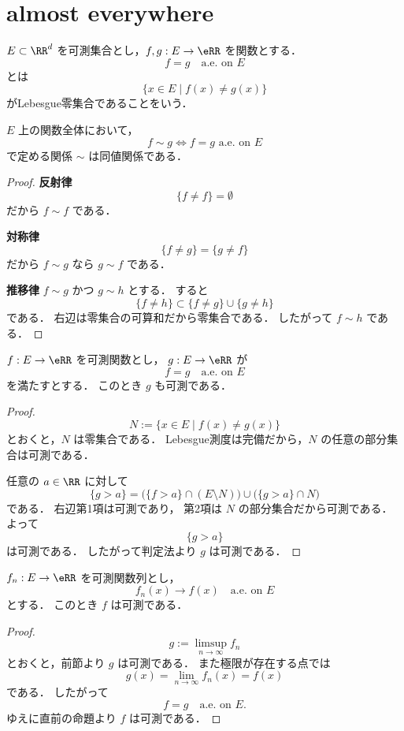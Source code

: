 \section{almost everywhere}

\begin{definition}
$E \subset \RR^d$ を可測集合とし，$f,g:E\to\eRR$ を関数とする．
\[
f=g \quad \text{a.e.\ on } E
\]
とは
\[
\{x\in E\mid f(x)\ne g(x)\}
\]
がLebesgue零集合であることをいう．
\end{definition}

\begin{proposition}
$E$ 上の関数全体において，
\[
f\sim g \iff f=g \text{ a.e.\ on } E
\]
で定める関係 $\sim$ は同値関係である．
\end{proposition}
\begin{proof}
\textbf{反射律}\quad
\[
\{f\ne f\}=\emptyset
\]
だから $f\sim f$ である．

\textbf{対称律}\quad
\[
\{f\ne g\}=\{g\ne f\}
\]
だから $f\sim g$ なら $g\sim f$ である．

\textbf{推移律}\quad
$f\sim g$ かつ $g\sim h$ とする．
すると
\[
\{f\ne h\}\subset \{f\ne g\}\cup\{g\ne h\}
\]
である．
右辺は零集合の可算和だから零集合である．
したがって $f\sim h$ である．
\end{proof}

\begin{proposition}[a.e.\ 修正による可測性]
$f:E\to\eRR$ を可測関数とし，
$g:E\to\eRR$ が
\[
f=g \quad \text{a.e.\ on } E
\]
を満たすとする．
このとき $g$ も可測である．
\end{proposition}
\begin{proof}
\[
N:=\{x\in E\mid f(x)\ne g(x)\}
\]
とおくと，$N$ は零集合である．
Lebesgue測度は完備だから，$N$ の任意の部分集合は可測である．

任意の $a\in\RR$ に対して
\[
\{g>a\}
=
\bigl(\{f>a\}\cap(E\setminus N)\bigr)\cup\bigl(\{g>a\}\cap N\bigr)
\]
である．
右辺第1項は可測であり，
第2項は $N$ の部分集合だから可測である．
よって
\[
\{g>a\}
\]
は可測である．
したがって判定法より $g$ は可測である．
\end{proof}

\begin{corollary}[a.e.\ 極限の可測性]
$f_n:E\to\eRR$ を可測関数列とし，
\[
f_n(x)\to f(x)\quad \text{a.e.\ on } E
\]
とする．
このとき $f$ は可測である．
\end{corollary}
\begin{proof}
\[
g:=\limsup_{n\to\infty}f_n
\]
とおくと，前節より $g$ は可測である．
また極限が存在する点では
\[
g(x)=\lim_{n\to\infty}f_n(x)=f(x)
\]
である．
したがって
\[
f=g \quad \text{a.e.\ on } E.
\]
ゆえに直前の命題より $f$ は可測である．
\end{proof}

